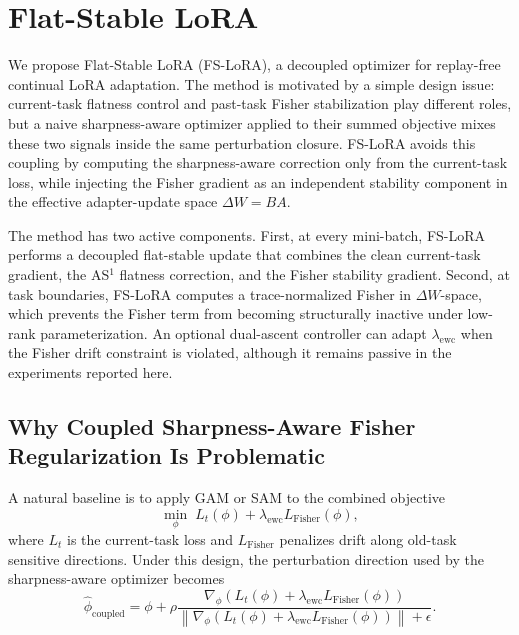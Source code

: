 \section{Flat-Stable LoRA}
\label{sec:method}

We propose Flat-Stable LoRA (FS-LoRA), a decoupled optimizer for replay-free continual LoRA adaptation.
The method is motivated by a simple design issue: current-task flatness control and past-task Fisher stabilization play different roles, but a naive sharpness-aware optimizer applied to their summed objective mixes these two signals inside the same perturbation closure.
FS-LoRA avoids this coupling by computing the sharpness-aware correction only from the current-task loss, while injecting the Fisher gradient as an independent stability component in the effective adapter-update space $\Delta W=BA$.

The method has two active components.
First, at every mini-batch, FS-LoRA performs a decoupled flat-stable update that combines the clean current-task gradient, the AS$^1$ flatness correction, and the Fisher stability gradient.
Second, at task boundaries, FS-LoRA computes a trace-normalized Fisher in $\Delta W$-space, which prevents the Fisher term from becoming structurally inactive under low-rank parameterization.
An optional dual-ascent controller can adapt $\lambda_{\mathrm{ewc}}$ when the Fisher drift constraint is violated, although it remains passive in the experiments reported here.

\subsection{Why Coupled Sharpness-Aware Fisher Regularization Is Problematic}
\label{sec:coupled_problem}

A natural baseline is to apply GAM or SAM to the combined objective
\begin{equation}
\min_{\phi}
\;
L_t(\phi)
+
\lambda_{\mathrm{ewc}}
L_{\mathrm{Fisher}}(\phi),
\label{eq:coupled_objective}
\end{equation}
where $L_t$ is the current-task loss and $L_{\mathrm{Fisher}}$ penalizes drift along old-task sensitive directions.
Under this design, the perturbation direction used by the sharpness-aware optimizer becomes
\begin{equation}
\hat{\phi}_{\mathrm{coupled}}
=
\phi
+
\rho
\frac{
\nabla_{\phi}
\left(
L_t(\phi)
+
\lambda_{\mathrm{ewc}}
L_{\mathrm{Fisher}}(\phi)
\right)
}{
\left\|
\nabla_{\phi}
\left(
L_t(\phi)
+
\lambda_{\mathrm{ewc}}
L_{\mathrm{Fisher}}(\phi)
\right)
\right\|
+
\epsilon
}.
\label{eq:coupled_perturb}
\end{equation}

